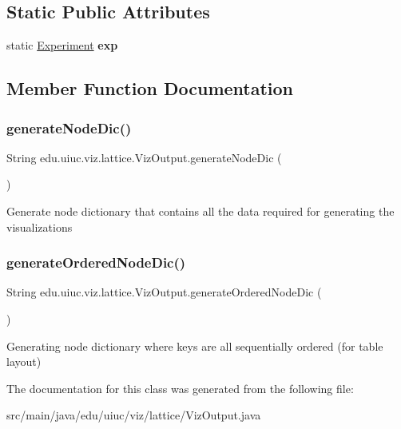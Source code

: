 \subsection*{Static Public Attributes}
\begin{DoxyCompactItemize}
\item 
\mbox{\label{classedu_1_1uiuc_1_1viz_1_1lattice_1_1_viz_output_a3192697fe0bef42f79b1eb58ba57bac0}} 
static \mbox{\hyperlink{classedu_1_1uiuc_1_1viz_1_1algorithms_1_1_experiment}{Experiment}} {\bfseries exp}
\end{DoxyCompactItemize}


\subsection{Member Function Documentation}
\mbox{\label{classedu_1_1uiuc_1_1viz_1_1lattice_1_1_viz_output_a90b2abe7b944e3e412f515829e23a79a}} 
\subsubsection{\texorpdfstring{generateNodeDic()}{generateNodeDic()}}
{\footnotesize\ttfamily String edu.\+uiuc.\+viz.\+lattice.\+Viz\+Output.\+generate\+Node\+Dic (\begin{DoxyParamCaption}{ }\end{DoxyParamCaption})}

Generate node dictionary that contains all the data required for generating the visualizations \mbox{\label{classedu_1_1uiuc_1_1viz_1_1lattice_1_1_viz_output_ad47008139c9bc6986968fa0d42c0d619}} 
\subsubsection{\texorpdfstring{generateOrderedNodeDic()}{generateOrderedNodeDic()}}
{\footnotesize\ttfamily String edu.\+uiuc.\+viz.\+lattice.\+Viz\+Output.\+generate\+Ordered\+Node\+Dic (\begin{DoxyParamCaption}{ }\end{DoxyParamCaption})}

Generating node dictionary where keys are all sequentially ordered (for table layout) 

The documentation for this class was generated from the following file\+:\begin{DoxyCompactItemize}
\item 
src/main/java/edu/uiuc/viz/lattice/Viz\+Output.\+java\end{DoxyCompactItemize}
